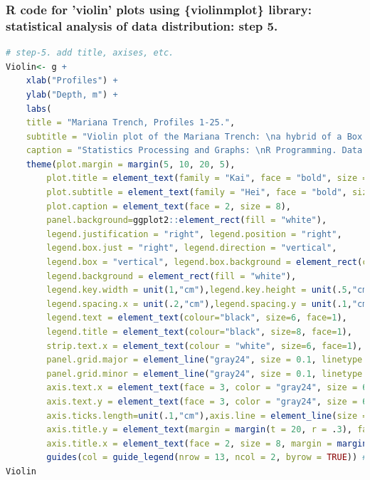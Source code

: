 \documentclass[pdflatex,compress,10pt,
	xcolor={dvipsnames,dvipsnames,svgnames,x11names,table},
	hyperref={colorlinks = true,breaklinks = true, urlcolor = NavyBlue, breaklinks = true}]{beamer}
\begin{document}
\begin{frame}[fragile,shrink=20]\frametitle{R code for 'violin' plots using \{violinmplot\} library: statistical analysis of data distribution: step 5.}
\begin{lstlisting}[language=R]
	# step-5. add title, axises, etc.
Violin<- g +
	xlab("Profiles") + 
	ylab("Depth, m") +
	labs(
	title = "Mariana Trench, Profiles 1-25.", 
	subtitle = "Violin plot of the Mariana Trench: \na hybrid of a Box plot and a Kernel probability density estimation plot (rotated). \nMedian and Quantiles (0.25, 0.5, 0.75)",
	caption = "Statistics Processing and Graphs: \nR Programming. Data Source: QGIS") +
	theme(plot.margin = margin(5, 10, 20, 5),
		plot.title = element_text(family = "Kai", face = "bold", size = 12),
		plot.subtitle = element_text(family = "Hei", face = "bold", size = 10),
		plot.caption = element_text(face = 2, size = 8),
		panel.background=ggplot2::element_rect(fill = "white"),
		legend.justification = "right", legend.position = "right",
		legend.box.just = "right", legend.direction = "vertical",
		legend.box = "vertical", legend.box.background = element_rect(colour = "honeydew4",size=0.2),
		legend.background = element_rect(fill = "white"),
		legend.key.width = unit(1,"cm"),legend.key.height = unit(.5,"cm"),
		legend.spacing.x = unit(.2,"cm"),legend.spacing.y = unit(.1,"cm"),
		legend.text = element_text(colour="black", size=6, face=1),
		legend.title = element_text(colour="black", size=8, face=1),
		strip.text.x = element_text(colour = "white", size=6, face=1),
		panel.grid.major = element_line("gray24", size = 0.1, linetype = "solid"),
		panel.grid.minor = element_line("gray24", size = 0.1, linetype = "dotted"),
		axis.text.x = element_text(face = 3, color = "gray24", size = 6, angle = 15),
		axis.text.y = element_text(face = 3, color = "gray24", size = 6, angle = 15),
		axis.ticks.length=unit(.1,"cm"),axis.line = element_line(size = .3, colour = "grey80"),
		axis.title.y = element_text(margin = margin(t = 20, r = .3), face = 2, size = 8),
		axis.title.x = element_text(face = 2, size = 8, margin = margin(t = .2))) +
		guides(col = guide_legend(nrow = 13, ncol = 2, byrow = TRUE)) # improve design
Violin		
\end{lstlisting}
\end{frame}
\end{document}
